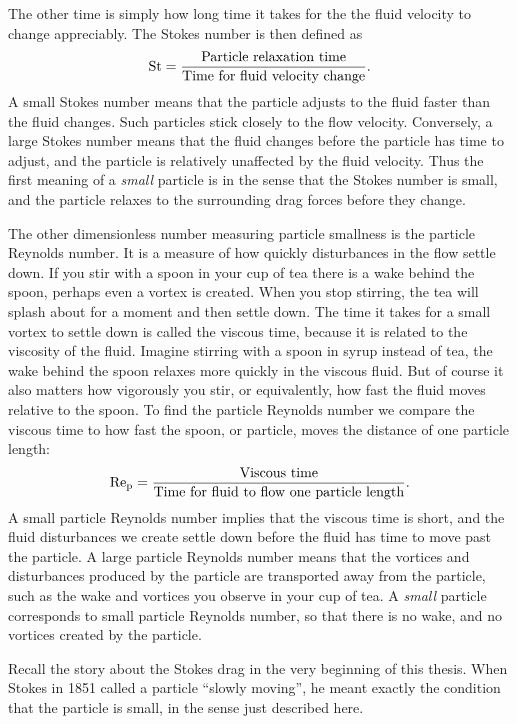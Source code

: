 \documentclass[thesis.tex]{subfiles}
\begin{document}
The other time is simply how long time it takes for the the fluid velocity to change appreciably. The Stokes number is then defined as
\begin{align*}
    \mbox{St} = \frac{\textrm{Particle relaxation time}}{\textrm{Time for fluid velocity change}}.
 \end{align*} 
A small Stokes number means that the particle adjusts to the fluid faster than the fluid changes. Such particles stick closely to the flow velocity. Conversely, a large Stokes number means that the fluid changes before the particle has time to adjust, and the particle is relatively unaffected by the fluid velocity. Thus the first meaning of a \emph{small} particle is in the sense that the Stokes number is small, and the particle relaxes to the surrounding drag forces before they change.

The other dimensionless number measuring particle smallness is the particle Reynolds number. It is a measure of how quickly disturbances in the flow settle down. If you stir with a spoon in your cup of tea there is a wake behind the spoon, perhaps even a vortex is created. When you stop stirring, the tea will splash about for a moment and then settle down. The time it takes for a small vortex to settle down is called the viscous time, because it is related to the viscosity of the fluid. Imagine stirring with a spoon in syrup instead of tea, the wake behind the spoon relaxes more quickly in the viscous fluid. But of course it also matters how vigorously you stir, or equivalently, how fast the fluid moves relative to the spoon. To find the particle Reynolds number we compare the viscous time to how fast the spoon, or particle, moves the distance of one particle length:
\begin{align*}
    \mbox{Re}_{\mathrm p} = \frac{\textrm{Viscous time}}{\textrm{Time for fluid to flow one particle length}}.
 \end{align*} 
A small particle Reynolds number implies that the viscous time is short, and the fluid disturbances we create settle down before the fluid has time to move past the particle. A large particle Reynolds number means that the vortices and disturbances produced by the particle are transported away from the particle, such as the wake and vortices you observe in your cup of tea. A \emph{small} particle corresponds to small particle Reynolds number, so that there is no wake, and no vortices created by the particle. 

Recall the story about the Stokes drag in the very beginning of this thesis. When Stokes in 1851 called a particle ``slowly moving'', he meant exactly the condition that the particle is small, in the sense just described here.
\end{document}
